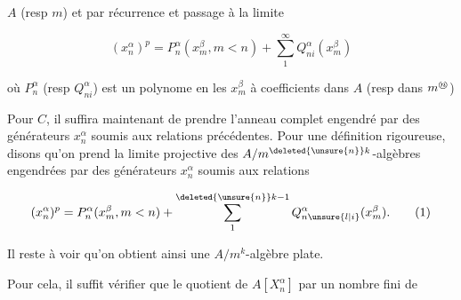 $A$ (resp $m$) et par récurrence et passage à la limite


\[
\boxed{(x_n^\alpha)^p=P_n^\alpha(x_m^\beta,m<n)+\sum_{1}^{\infty}Q_{ni}^\alpha(x_m^\beta)}
\]

où $P_n^\alpha$ (resp $Q_{ni}^\alpha$) est un polynome en les $x_m^\beta$ à coefficients dans $A$ (resp dans $m^{\text{\textcircled{\scriptsize$n$}}}$)

Pour $C$, il suffira maintenant de prendre l'anneau complet engendré par des générateurs $x_n^\alpha$ soumis aux relations précédentes. Pour une définition rigoureuse, disons qu'on prend la limite projective des $A/m^{\deleted{\unsure{n}}k}$-algèbres engendrées par des générateurs $x_n^\alpha$ soumis aux relations

\[
(x_n^\alpha)^p=P_n^\alpha(x_m^\beta,m<n)+\sum_{1}^{\deleted{\unsure{n}}k-1}Q_{n\unsure{l|i}}^\alpha(x_m^\beta). \tag*{(1)}
\]

Il reste à voir qu'on obtient ainsi une $A/m^k$-algèbre plate.

Pour cela, il suffit vérifier que le quotient de $A[X_n^\alpha]$ par un nombre fini de
